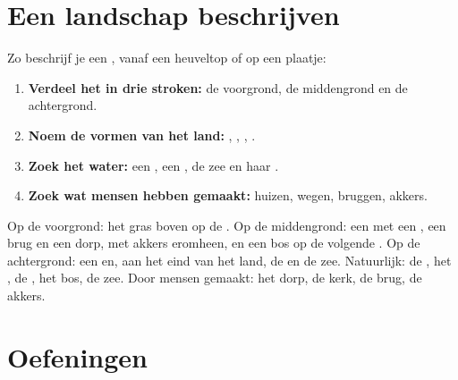 \section{Een landschap beschrijven}

\begin{method}\label{met:g1:landscapes-around-us:describe}
Zo beschrijf je een , vanaf een heuveltop of op een plaatje:
\begin{enumerate}
  \item \textbf{Verdeel het in drie stroken:} de voorgrond, de middengrond
        en de achtergrond.
  \item \textbf{Noem de vormen van het land:} , , ,
        .
  \item \textbf{Zoek het water:} een , een , de zee en haar .
  \item \textbf{Zoek wat mensen hebben gemaakt:} huizen, wegen, bruggen,
        akkers.
\end{enumerate}
\end{method}

\begin{example}\label{ex:g1:landscapes-around-us:mia}
Op de voorgrond: het gras boven op de . Op de middengrond: een 
met een , een brug en een dorp, met akkers eromheen, en een bos op de
volgende . Op de achtergrond: een  en, aan het eind van het
land, de  en de zee. Natuurlijk: de , het , de , het
bos, de zee. Door mensen gemaakt: het dorp, de kerk, de brug, de akkers.
\end{example}

\section{Oefeningen}

